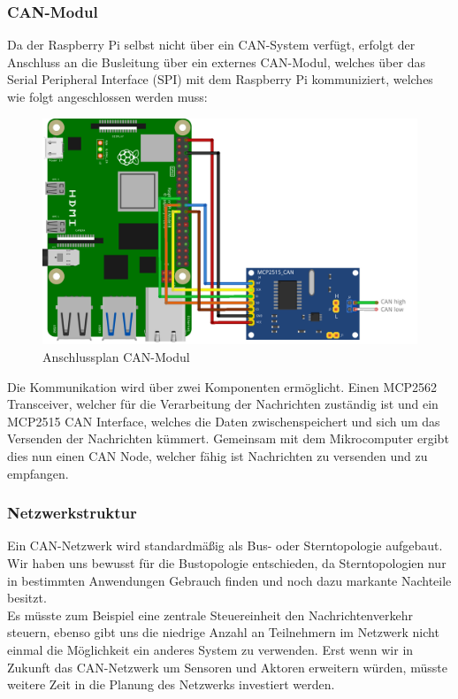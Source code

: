 \subsubsection{CAN-Modul}

Da der Raspberry Pi selbst nicht über ein CAN-System verfügt, erfolgt der Anschluss an die Busleitung über ein externes CAN-Modul, welches über das Serial Peripheral Interface (SPI) mit dem Raspberry Pi kommuniziert, welches wie folgt angeschlossen werden muss: 

\begin{figure}[H]
	\begin{center}
		\includegraphics[scale=0.9]{figures/hcis/can_module.png}
		\caption{Anschlussplan CAN-Modul}
	\end{center}
\end{figure}

Die Kommunikation wird über zwei Komponenten ermöglicht. Einen MCP2562 Transceiver, welcher für die Verarbeitung der Nachrichten zuständig ist und ein MCP2515 CAN Interface, welches die Daten zwischenspeichert und sich um das Versenden der Nachrichten kümmert. Gemeinsam mit dem Mikrocomputer ergibt dies nun einen CAN Node, welcher fähig ist Nachrichten zu versenden und zu empfangen.

\subsubsection{Netzwerkstruktur}

Ein CAN-Netzwerk wird standardmäßig als Bus- oder Sterntopologie aufgebaut. Wir haben uns bewusst für die Bustopologie entschieden, da Sterntopologien nur in bestimmten Anwendungen Gebrauch finden und noch dazu markante Nachteile besitzt.\\ Es müsste zum Beispiel eine zentrale Steuereinheit den Nachrichtenverkehr steuern, ebenso gibt uns die niedrige Anzahl an Teilnehmern im Netzwerk nicht einmal die Möglichkeit ein anderes System zu verwenden. Erst wenn wir in Zukunft das CAN-Netzwerk um Sensoren und Aktoren erweitern würden, müsste weitere Zeit in die Planung des Netzwerks investiert werden. 

